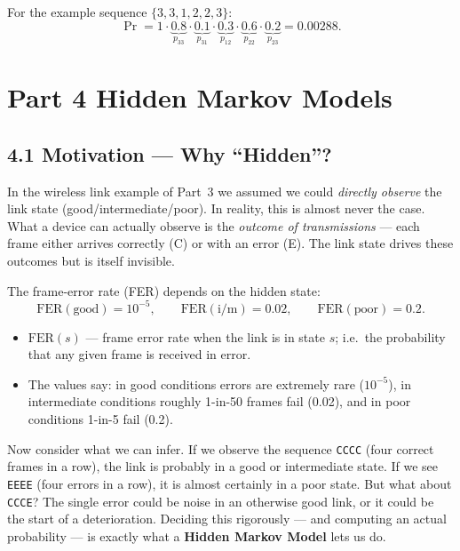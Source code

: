 \documentclass[12pt, a4paper]{article}
\begin{document}
For the example sequence $\{3,3,1,2,2,3\}$:
\[
  \Pr = 1 \cdot \underbrace{0.8}_{p_{33}} \cdot \underbrace{0.1}_{p_{31}}
      \cdot \underbrace{0.3}_{p_{12}} \cdot \underbrace{0.6}_{p_{22}}
      \cdot \underbrace{0.2}_{p_{23}} = 0.00288.
\]

\section*{Part 4 \quad Hidden Markov Models}

\subsection*{4.1 \quad Motivation --- Why ``Hidden''?}

In the wireless link example of Part~3 we assumed we could \emph{directly
observe} the link state (good/intermediate/poor). In reality, this is almost
never the case. What a device can actually observe is the \emph{outcome of
transmissions} --- each frame either arrives correctly (C) or with an error
(E). The link state drives these outcomes but is itself invisible.

The frame-error rate (FER) depends on the hidden state:
\[
  \mathrm{FER}(\text{good}) = 10^{-5}, \qquad
  \mathrm{FER}(\text{i/m}) = 0.02, \qquad
  \mathrm{FER}(\text{poor}) = 0.2.
\]
\begin{itemize}[leftmargin=1.4em, itemsep=2pt]
  \item $\mathrm{FER}(s)$ --- frame error rate when the link is in state $s$;
    i.e.\ the probability that any given frame is received in error.
  \item The values say: in good conditions errors are extremely rare
    ($10^{-5}$), in intermediate conditions roughly 1-in-50 frames fail
    (0.02), and in poor conditions 1-in-5 fail (0.2).
\end{itemize}

Now consider what we can infer. If we observe the sequence \texttt{CCCC}
(four correct frames in a row), the link is probably in a good or intermediate
state. If we see \texttt{EEEE} (four errors in a row), it is almost certainly
in a poor state. But what about \texttt{CCCE}? The single error could be
noise in an otherwise good link, or it could be the start of a deterioration.
Deciding this rigorously --- and computing an actual probability --- is
exactly what a \textbf{Hidden Markov Model} lets us do.
\end{document}
